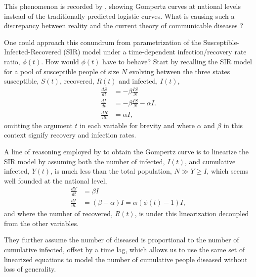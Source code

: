 \documentclass{article}
\newcommand{\insertSmallPdfFig}[3]{
  \begin{figure}[h]
  \centering
  \texttt{[image: \#1.pdf]}
  \caption{#2}
  \label{fig:#1}
  \end{figure}
}
\begin{document}

This phenomenon is recorded by \citep{Ohnishi2020,Rypdal2020,Catala2020,rodrigues2020monte,Levitt2020}, showing Gompertz curves at national levels instead of the traditionally predicted logistic curves. What is causing such a discrepancy between reality and the current theory of communicable diseases \citep{castro2020turning}?

One could approach this conundrum from parametrization of the Susceptible-Infected-Recovered (SIR) model under a time-dependent infection/recovery rate ratio, $\phi(t)$. How would $\phi(t)$ have to behave? Start by recalling the SIR model for a pool of susceptible people of size $N$ evolving between the three states susceptible, $S(t)$, recovered, $R(t)$ and infected, $I(t)$,
\begin{align}
\label{eq:SIR}
\frac{dS}{dt}& = -\beta \frac{IS}{N}\\
\frac{dI}{dt}& = -\beta \frac{IS}{N} - \alpha I.\\
\frac{dR}{dt}& = \alpha I,
\end{align}
omitting the argument $t$ in each variable for brevity and where $\alpha$ and $\beta$ in this context signify recovery and infection rates.

A line of reasoning employed by \citet{Rypdal2020} to obtain the Gompertz curve is to linearize the SIR model by assuming
both the number of infected, $I(t)$, and cumulative infected, $Y(t)$, is much less than the total population, $N \gg Y \ge I$, which seems well founded at the national level,
\begin{align}
\label{eq:linSIR}
\frac{dY}{dt}& = \beta I\\
\frac{dI}{dt}& = (\beta - \alpha) I = \alpha (\phi(t) - 1) I,
\end{align}
and where the number of recovered, $R(t)$, is under this linearization decoupled from the other variables. 

They further assume the number of diseased is proportional to the number of cumulative infected, offset by a time lag, which allows us to use the same set of linearized equations to model the number of cumulative people diseased without loss of generality.
\end{document}
